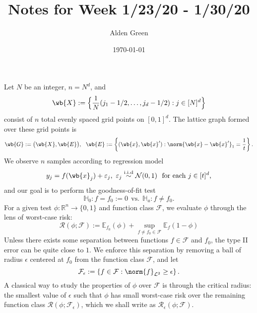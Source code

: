 \documentclass{article}
\newcommand{\Reals}{\mathbb{R}}
\newcommand{\set}[1]{\left\{#1\right\}}
\newcommand{\1}{\mathbf{1}}
\newcommand{\Leb}{\mathcal{L}}
\newcommand{\Ebb}{\mathbb{E}}
\theoremstyle{alden}
\theoremstyle{aldenthm}
\theoremstyle{definition}
\theoremstyle{remark}
\begin{document}
\title{Notes for Week 1/23/20 - 1/30/20}
\author{Alden Green}
\date{\today}
\maketitle

Let $N$ be an integer, $n = N^d$, and 
\begin{equation*}
\wb{X} := \Bigl\{\frac{1}{N}(j_1 - 1/2,\ldots,j_d - 1/2): j \in [N]^d\Bigr\}
\end{equation*}
consist of $n$ total evenly spaced grid points on $[0,1]^d$. The lattice graph formed over these grid points is 
\begin{equation*}
\wb{G} := \bigl(\wb{X},\wb{E}\bigr),~~ \wb{E} := \set{(\wb{x},\wb{x}'): \norm{\wb{x} - \wb{x}'}_1 = \frac{1}{t}}.
\end{equation*}
We observe $n$ samples according to regression model
\begin{equation}
\label{eqn:grid_regression_model}
y_j = f(\wb{x}_j) + \varepsilon_j, ~\varepsilon_j \overset{\mathrm{i.i.d}}{\sim} \mathcal{N}(0,1) ~~\textrm{for each $j \in [t]^d$,}
\end{equation}
and our goal is to perform the goodness-of-fit test
\begin{equation*}
\mathbb{H}_0 : f = f_0 := 0 ~~\textrm{vs.}~~ \mathbb{H}_a: f \neq f_0.
\end{equation*}
For a given test $\phi:\Reals^n \to \{0,1\}$ and function class $\mathcal{F}$, we evaluate $\phi$ through the lens of worst-case risk:
\begin{equation*}
\mathcal{R}(\phi; \mathcal{F}) := \Ebb_{f_0}(\phi) + \sup_{f \neq f_0 \in \mathcal{F}}\Ebb_{f}(1 - \phi)
\end{equation*}
Unless there exists some separation between functions $f \in \mathcal{F}$ and $f_0$, the type II error can be quite close to $1$. We enforce this separation by removing a ball of radius $\epsilon$ centered at $f_0$ from the function class $\mathcal{F}$, and let
\begin{equation*}
\mathcal{F}_{\epsilon} := \set{f \in \mathcal{F}: \norm{f}_{\Leb^2} \geq \epsilon}.
\end{equation*}
A classical way to study the properties of $\phi$ over $\mathcal{F}$ is through the critical radius: the smallest value of $\epsilon$ such that $\phi$ has small worst-case risk over the remaining function class $\mathcal{R}(\phi;\mathcal{F}_{\epsilon})$, which we shall write as $\mathcal{R}_{\epsilon}(\phi;\mathcal{F})$.  
\end{document}
